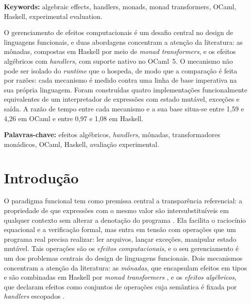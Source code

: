 \documentclass[12pt]{article}
\newcommand{\FaixaRTHaskell}{0,97 e 1,08}
\newcommand{\FaixaRTOcaml}{1,59 e 4,26}
\begin{document}
\noindent\textbf{Keywords:} algebraic effects, handlers, monads, monad
transformers, OCaml, Haskell, experimental evaluation.

\begin{resumo}
O gerenciamento de efeitos computacionais é um desafio central no design de
linguagens funcionais, e duas abordagens concentram a atenção da literatura:
as mônadas, compostas em Haskell por meio de \textit{monad transformers}, e os
efeitos algébricos com \textit{handlers}, com suporte nativo no OCaml~5. O
mecanismo não pode ser isolado do \textit{runtime} que o hospeda, de modo que
a comparação é feita por razões: cada mecanismo é medido contra uma linha de
base imperativa na sua própria linguagem. Foram construídas quatro
implementações funcionalmente equivalentes de um interpretador de expressões
com estado mutável, exceções e saída. A razão de
tempo entre cada mecanismo e a sua base situa-se entre \FaixaRTOcaml{} em OCaml
e entre \FaixaRTHaskell{} em Haskell.
\end{resumo}

\noindent\textbf{Palavras-chave:} efeitos algébricos, \textit{handlers},
mônadas, transformadores monádicos, OCaml, Haskell, avaliação experimental.

\section{Introdução}\label{sec:intro}

O paradigma funcional tem como premissa central a transparência referencial: a
propriedade de que expressões com o mesmo valor são intersubstituíveis em
qualquer contexto sem alterar a denotação do programa \cite{strachey:67}. Ela
facilita o raciocínio equacional e a verificação formal, mas
entra em tensão com operações que um programa real precisa realizar: ler
arquivos, lançar exceções, manipular estado mutável. Tais operações são os
\textit{efeitos computacionais}, e o seu gerenciamento é um dos problemas
centrais do design de linguagens funcionais. Dois mecanismos concentram a
atenção da literatura: as \textit{mônadas}, que encapsulam efeitos em tipos
\cite{moggi:91,wadler:92} e são combinadas em Haskell por \textit{monad
transformers} \cite{liang:95}, e os \textit{efeitos algébricos}, que declaram
efeitos como conjuntos de operações \cite{plotkin:03} cuja semântica é fixada
por \textit{handlers} escopados \cite{plotkin:09}.
\end{document}
